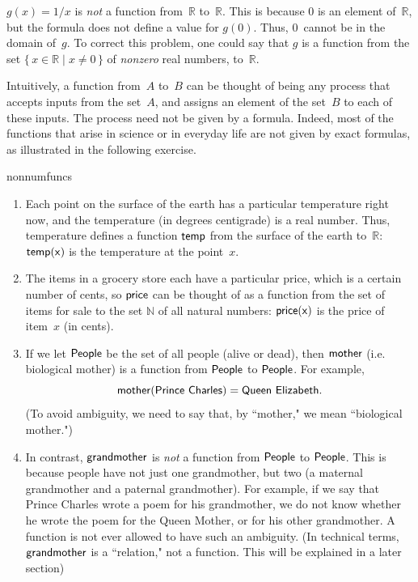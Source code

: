 \begin{example}{}
$g(x) = 1/x$ is \emph{not} a function from~$\mathbb{R}$ to~$\mathbb{R}$.
This is because $0$ is an element of~$\mathbb{R}$, but the formula does not define a value for $g(0)$.
Thus, $0$~cannot be in the domain of~$g$. To correct this problem, one could say that $g$ is a function from the set $\{\, x \in \mathbb{R} \mid x \neq 0\,\}$ of \emph{nonzero} real numbers, to~$\mathbb{R}$.
\end{example}

Intuitively, a function from~$A$ to~$B$ can be thought of being any process that accepts inputs from the set~$A$, and assigns an element of the set~$B$ to each of these inputs.
The process need not be given by a formula.
Indeed, most of the functions that arise in science or in everyday life are not given by exact formulas, as illustrated in the following exercise.

\begin{example}{nonnumfuncs} \ 
\begin{enumerate}
\item Each point on the surface of the earth has a particular temperature right now,
and the temperature (in degrees centigrade) is a real number.
Thus, temperature defines a function $\sf{temp}$ from the surface of the earth to~$\mathbb{R}$:
 $\sf{temp}(x)$ is the temperature at the point~$x$.
 \item The items in a grocery store each have a particular price, which is a certain number of cents, so $\sf{price}$ can be thought of as a function from the set of items for sale to the set $\mathbb{N}$ of all natural numbers:
 $\sf{price}(x)$ is the price of item~$x$ (in cents).
 \item If we let $\sf{People}$ be the set of all people (alive or dead), then $\sf{mother}$ (i.e. biological mother) is a function from $\sf{People}$ to $\sf{People}$. For example, 
 $$\var{mother}(\var{Prince\ Charles}) = \var{Queen\ Elizabeth} .$$
 (To avoid ambiguity, we need to say that, by ``mother," we mean ``biological mother.")
 \item In contrast, $\sf{grandmother}$ is \emph{not} a function
  from $\sf{People}$ to $\sf{People}$. 
 This is because people have not just one grandmother, but two (a maternal grandmother and a paternal grandmother). For example, if we say that Prince Charles wrote a poem for his grandmother, we do not know whether he wrote the poem for the Queen Mother, or for his other grandmother. A function is not ever allowed to have such an ambiguity.
 (In technical terms, $\sf{grandmother}$ is a ``relation," not a function. 
 This will be explained in a later section)
\end{enumerate}
\end{example}

